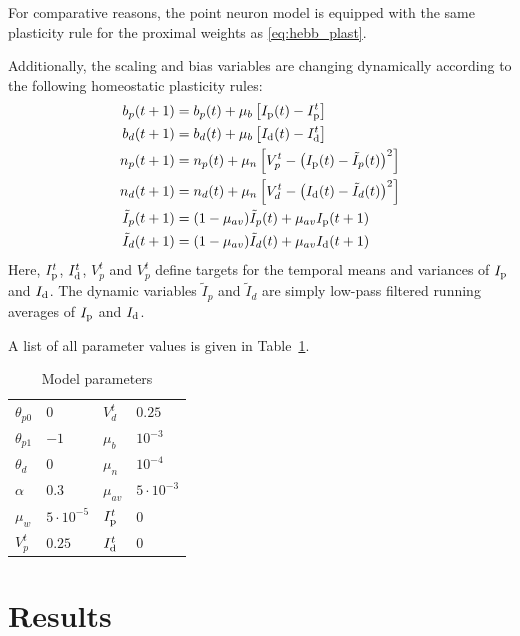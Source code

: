 \documentclass[utf8]{frontiersSCNS} %
\begin{document}
For comparative reasons, the point neuron model is equipped with the
same plasticity rule for the proximal weights as \eqref{eq:hebb_plast}. 

Additionally, the scaling and bias variables are changing dynamically
according to the following homeostatic plasticity rules:
\begin{align}
b_p(t+1) &= b_p(t) + \mu_b \left[I_{\rm p}(t) - I_{\rm p}^t\right] \\
b_d(t+1) &= b_d(t) + \mu_b \left[I_{\rm d}(t) - I_{\rm d}^t\right] \\
n_p(t+1) &= n_p(t) + 
\mu_n \left[V_p^t - \left( I_{\rm p}(t) - \tilde{I}_p(t)\right)^2\right] \\
n_d(t+1) &= n_d(t) + 
\mu_n \left[V_d^t - \left( I_{\rm d}(t) - \tilde{I}_d(t)\right)^2\right] \\
\tilde{I}_p(t+1) &= (1-\mu_{av})\tilde{I}_p(t) + \mu_{av} I_{\rm p}(t+1) \\
\tilde{I}_d(t+1) &= (1-\mu_{av})\tilde{I}_d(t) + \mu_{av} I_{\rm d}(t+1)
\end{align}
Here, $I_{\rm p}^t$, $I_{\rm d}^t$, $V_p^t$ and $V_p^t$ define targets for the 
temporal means and variances of $I_{\rm p}$ and $I_{\rm d}$. 
The dynamic variables $\tilde{I}_p$ and $\tilde{I}_d$ are simply 
low-pass filtered running averages of $I_{\rm p}$ and $I_{\rm d}$.

A list of all parameter values is given in Table~\ref{tab:parameters}.

\begin{table}
	\begin{tabular}{ l | l || l | l }
		$\theta_{p0}$ & $0$ & $V_d^t$ & $0.25$ \\
		$\theta_{p1}$ & $-1$ & $\mu_b$ & $10^{-3}$ \\ 
		$\theta_{d}$ & $0$ & $\mu_n$ & $10^{-4}$ \\  
		$\alpha$ & $0.3$ & $\mu_{av}$ & $5 \cdot 10^{-3}$ \\   
		$\mu_w$ & $5 \cdot 10^{-5}$ & $I_{\rm p}^t$ & $0$ \\
		$V_p^t$ & $0.25$ & $I_{\rm d}^t$ & $0$  
	\end{tabular}
	\caption{Model parameters}
	\label{tab:parameters}
\end{table}

\section{Results}
\label{sect:results}
\end{document}
